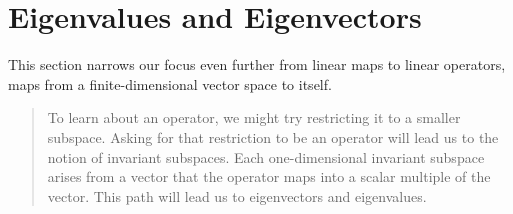\clearpage
\section{Eigenvalues and Eigenvectors}

This section narrows our focus even further from linear maps to linear operators, maps from a finite-dimensional vector space to itself. 

\begin{quotation}
    To learn about an operator, we might try restricting it to a smaller subspace.
Asking for that restriction to be an operator will lead us to the notion of invariant
subspaces. Each one-dimensional invariant subspace arises from a vector that
the operator maps into a scalar multiple of the vector. This path will lead us to
eigenvectors and eigenvalues.
\end{quotation}





